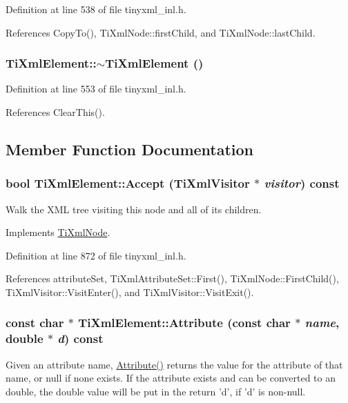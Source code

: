 Definition at line 538 of file tinyxml\_\-inl.h.

References CopyTo(), TiXmlNode::firstChild, and TiXmlNode::lastChild.\hypertarget{class_ti_xml_element_aa049a47c5081c0d021968666360da261}{
\subsubsection[{$\sim$TiXmlElement}]{\setlength{\rightskip}{0pt plus 5cm}TiXmlElement::$\sim$TiXmlElement ()}}
\label{class_ti_xml_element_aa049a47c5081c0d021968666360da261}


Definition at line 553 of file tinyxml\_\-inl.h.

References ClearThis().

\subsection{Member Function Documentation}
\hypertarget{class_ti_xml_element_a31ab28cc3b892a69254391d6bbe08df3}{
\subsubsection[{Accept}]{\setlength{\rightskip}{0pt plus 5cm}bool TiXmlElement::Accept ({\bf TiXmlVisitor} $\ast$ {\em visitor}) const}}
\label{class_ti_xml_element_a31ab28cc3b892a69254391d6bbe08df3}
Walk the XML tree visiting this node and all of its children. 

Implements \hyperlink{class_ti_xml_node_acc0f88b7462c6cb73809d410a4f5bb86}{TiXmlNode}.

Definition at line 872 of file tinyxml\_\-inl.h.

References attributeSet, TiXmlAttributeSet::First(), TiXmlNode::FirstChild(), TiXmlVisitor::VisitEnter(), and TiXmlVisitor::VisitExit().\hypertarget{class_ti_xml_element_aec4f727f8aa49b51248d80125d173136}{
\subsubsection[{Attribute}]{\setlength{\rightskip}{0pt plus 5cm}const char $\ast$ TiXmlElement::Attribute (const char $\ast$ {\em name}, \/  double $\ast$ {\em d}) const}}
\label{class_ti_xml_element_aec4f727f8aa49b51248d80125d173136}
Given an attribute name, \hyperlink{class_ti_xml_element_ac1e4691e9375ba4e665dce7e46a50a9c}{Attribute()} returns the value for the attribute of that name, or null if none exists. If the attribute exists and can be converted to an double, the double value will be put in the return 'd', if 'd' is non-\/null. 

